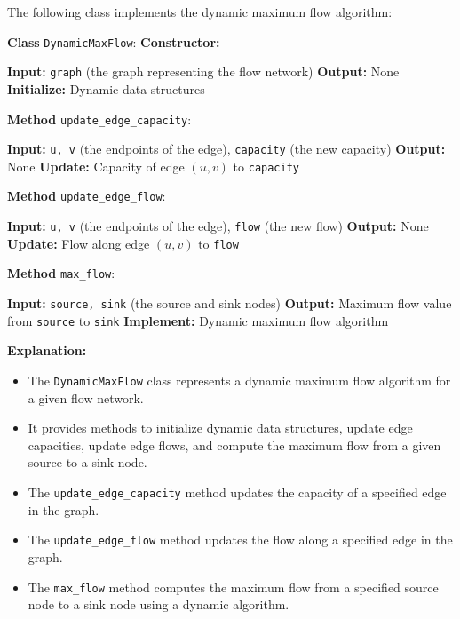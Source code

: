 \documentclass[12pt]{book} %
\begin{document}
The following class implements the dynamic maximum flow algorithm:
\FloatBarrier
\begin{algorithm}
\caption{Dynamic Maximum Flow}\label{dynamic-max-flow}
\begin{algorithmic}[1]
\State \textbf{Class} \texttt{DynamicMaxFlow}:
    \State \textbf{Constructor:}

        \State \textbf{Input:} \texttt{graph} (the graph representing the flow network)
        \State \textbf{Output:} None
        \State \textbf{Initialize:} Dynamic data structures

    \State \textbf{Method} \texttt{update\_edge\_capacity}:

        \State \textbf{Input:} \texttt{u, v} (the endpoints of the edge), \texttt{capacity} (the new capacity)
        \State \textbf{Output:} None
        \State \textbf{Update:} Capacity of edge $(u, v)$ to \texttt{capacity}

    \State \textbf{Method} \texttt{update\_edge\_flow}:

        \State \textbf{Input:} \texttt{u, v} (the endpoints of the edge), \texttt{flow} (the new flow)
        \State \textbf{Output:} None
        \State \textbf{Update:} Flow along edge $(u, v)$ to \texttt{flow}

    \State \textbf{Method} \texttt{max\_flow}:

        \State \textbf{Input:} \texttt{source, sink} (the source and sink nodes)
        \State \textbf{Output:} Maximum flow value from \texttt{source} to \texttt{sink}
        \State \textbf{Implement:} Dynamic maximum flow algorithm

\end{algorithmic}
\end{algorithm}
\FloatBarrier
\textbf{Explanation:}
\begin{itemize}
    \item The \texttt{DynamicMaxFlow} class represents a dynamic maximum flow algorithm for a given flow network.
    \item It provides methods to initialize dynamic data structures, update edge capacities, update edge flows, and compute the maximum flow from a given source to a sink node.
    \item The \texttt{update\_edge\_capacity} method updates the capacity of a specified edge in the graph.
    \item The \texttt{update\_edge\_flow} method updates the flow along a specified edge in the graph.
    \item The \texttt{max\_flow} method computes the maximum flow from a specified source node to a sink node using a dynamic algorithm.
\end{itemize}
\end{document}
